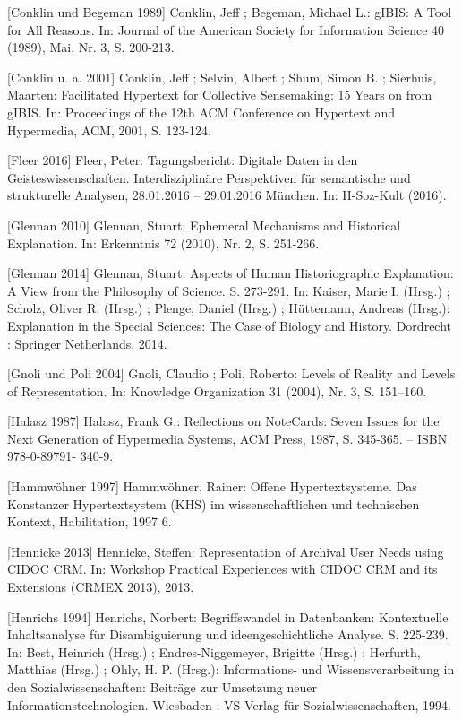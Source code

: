 \documentclass[a4paper,
fontsize=11pt,
oneside,
numbers=noperiodatend,
parskip=half-,
bibliography=totoc,
final
]{scrartcl}
\begin{document}
{[}Conklin und Begeman 1989{]} Conklin, Jeff ; Begeman, Michael L.:
gIBIS: A Tool for All Reasons. In: Journal of the American Society for
Information Science 40 (1989), Mai, Nr. 3, S. 200-213.

{[}Conklin u. a. 2001{]} Conklin, Jeff ; Selvin, Albert ; Shum, Simon B.
; Sierhuis, Maarten: Facilitated Hypertext for Collective Sensemaking:
15 Years on from gIBIS. In: Proceedings of the 12th ACM Conference on
Hypertext and Hypermedia, ACM, 2001, S. 123-124.

{[}Fleer 2016{]} Fleer, Peter: Tagungsbericht: Digitale Daten in den
Geisteswissenschaften. Interdisziplinäre Perspektiven für semantische
und strukturelle Analysen, 28.01.2016 -- 29.01.2016 München. In:
H-Soz-Kult (2016).

{[}Glennan 2010{]} Glennan, Stuart: Ephemeral Mechanisms and Historical
Explanation. In: Erkenntnis 72 (2010), Nr. 2, S. 251-266.

{[}Glennan 2014{]} Glennan, Stuart: Aspects of Human Historiographic
Explanation: A View from the Philosophy of Science. S. 273-291. In:
Kaiser, Marie I. (Hrsg.) ; Scholz, Oliver R. (Hrsg.) ; Plenge, Daniel
(Hrsg.) ; Hüttemann, Andreas (Hrsg.): Explanation in the Special
Sciences: The Case of Biology and History. Dordrecht : Springer
Netherlands, 2014.

{[}Gnoli und Poli 2004{]} Gnoli, Claudio ; Poli, Roberto: Levels of
Reality and Levels of Representation. In: Knowledge Organization 31
(2004), Nr. 3, S. 151--160.

{[}Halasz 1987{]} Halasz, Frank G.: Reflections on NoteCards: Seven
Issues for the Next Generation of Hypermedia Systems, ACM Press, 1987,
S. 345-365. -- ISBN 978-0-89791- 340-9.

{[}Hammwöhner 1997{]} Hammwöhner, Rainer: Offene Hypertextsysteme. Das
Konstanzer Hypertextsystem (KHS) im wissenschaftlichen und technischen
Kontext, Habilitation, 1997 6.

{[}Hennicke 2013{]} Hennicke, Steffen: Representation of Archival User
Needs using CIDOC CRM. In: Workshop Practical Experiences with CIDOC CRM
and its Extensions (CRMEX 2013), 2013.

{[}Henrichs 1994{]} Henrichs, Norbert: Begriffswandel in Datenbanken:
Kontextuelle Inhaltsanalyse für Disambiguierung und ideengeschichtliche
Analyse. S. 225-239. In: Best, Heinrich (Hrsg.) ; Endres-Niggemeyer,
Brigitte (Hrsg.) ; Herfurth, Matthias (Hrsg.) ; Ohly, H. P. (Hrsg.):
In\-for\-ma\-ti\-ons- und Wissensverarbeitung in den Sozialwissenschaften:
Beiträge zur Umsetzung neuer Informationstechnologien. Wiesbaden : VS
Verlag für Sozialwissenschaften, 1994.
\end{document}

